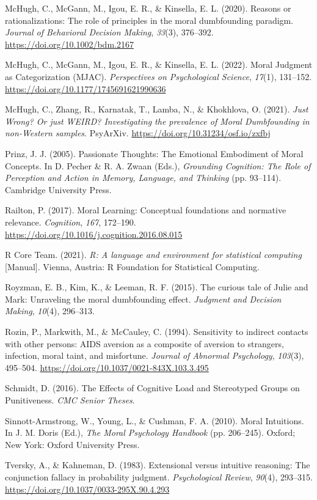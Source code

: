 \documentclass[
  american,
  man,floatsintext]{apa7}
\begin{document}
\leavevmode\hypertarget{ref-mchugh_reasons_2020}{}%
McHugh, C., McGann, M., Igou, E. R., \& Kinsella, E. L. (2020). Reasons or rationalizations: The role of principles in the moral dumbfounding paradigm. \emph{Journal of Behavioral Decision Making}, \emph{33}(3), 376--392. \url{https://doi.org/10.1002/bdm.2167}

\leavevmode\hypertarget{ref-mchugh_moral_2022}{}%
McHugh, C., McGann, M., Igou, E. R., \& Kinsella, E. L. (2022). Moral Judgment as Categorization (MJAC). \emph{Perspectives on Psychological Science}, \emph{17}(1), 131--152. \url{https://doi.org/10.1177/1745691621990636}

\leavevmode\hypertarget{ref-mchugh_just_2021}{}%
McHugh, C., Zhang, R., Karnatak, T., Lamba, N., \& Khokhlova, O. (2021). \emph{Just Wrong? Or just WEIRD? Investigating the prevalence of Moral Dumbfounding in non-Western samples}. PsyArXiv. \url{https://doi.org/10.31234/osf.io/zxfbj}

\leavevmode\hypertarget{ref-prinz_passionate_2005}{}%
Prinz, J. J. (2005). Passionate Thoughts: The Emotional Embodiment of Moral Concepts. In D. Pecher \& R. A. Zwaan (Eds.), \emph{Grounding Cognition: The Role of Perception and Action in Memory, Language, and Thinking} (pp. 93--114). Cambridge University Press.

\leavevmode\hypertarget{ref-railton_moral_2017}{}%
Railton, P. (2017). Moral Learning: Conceptual foundations and normative relevance. \emph{Cognition}, \emph{167}, 172--190. \url{https://doi.org/10.1016/j.cognition.2016.08.015}

\leavevmode\hypertarget{ref-r_core_team_r:_2021}{}%
R Core Team. (2021). \emph{R: A language and environment for statistical computing} {[}Manual{]}. Vienna, Austria: R Foundation for Statistical Computing.

\leavevmode\hypertarget{ref-royzman_curious_2015}{}%
Royzman, E. B., Kim, K., \& Leeman, R. F. (2015). The curious tale of Julie and Mark: Unraveling the moral dumbfounding effect. \emph{Judgment and Decision Making}, \emph{10}(4), 296--313.

\leavevmode\hypertarget{ref-rozin_sensitivity_1994}{}%
Rozin, P., Markwith, M., \& McCauley, C. (1994). Sensitivity to indirect contacts with other persons: AIDS aversion as a composite of aversion to strangers, infection, moral taint, and misfortune. \emph{Journal of Abnormal Psychology}, \emph{103}(3), 495--504. \url{https://doi.org/10.1037/0021-843X.103.3.495}

\leavevmode\hypertarget{ref-schmidt_effects_2016}{}%
Schmidt, D. (2016). The Effects of Cognitive Load and Stereotyped Groups on Punitiveness. \emph{CMC Senior Theses}.

\leavevmode\hypertarget{ref-sinnott-armstrong_moral_2010}{}%
Sinnott-Armstrong, W., Young, L., \& Cushman, F. A. (2010). Moral Intuitions. In J. M. Doris (Ed.), \emph{The Moral Psychology Handbook} (pp. 206--245). Oxford; New York: Oxford University Press.

\leavevmode\hypertarget{ref-tversky_extensional_1983}{}%
Tversky, A., \& Kahneman, D. (1983). Extensional versus intuitive reasoning: The conjunction fallacy in probability judgment. \emph{Psychological Review}, \emph{90}(4), 293--315. \url{https://doi.org/10.1037/0033-295X.90.4.293}
\end{document}
